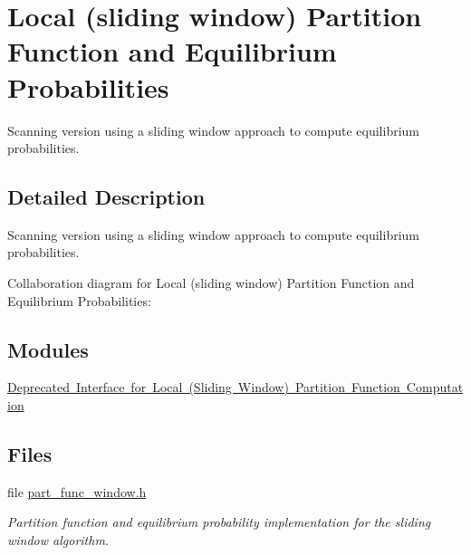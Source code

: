 \hypertarget{group__part__func__window}{}\section{Local (sliding window) Partition Function and Equilibrium Probabilities}
\label{group__part__func__window}


Scanning version using a sliding window approach to compute equilibrium probabilities.  




\subsection{Detailed Description}
Scanning version using a sliding window approach to compute equilibrium probabilities. 

Collaboration diagram for Local (sliding window) Partition Function and Equilibrium Probabilities\+:
\subsection*{Modules}
\begin{DoxyCompactItemize}
\item 
\mbox{\hyperlink{group__part__func__window__deprecated}{Deprecated Interface for Local (\+Sliding Window) Partition Function Computation}}
\end{DoxyCompactItemize}
\subsection*{Files}
\begin{DoxyCompactItemize}
\item 
file \mbox{\hyperlink{part__func__window_8h}{part\+\_\+func\+\_\+window.\+h}}
\begin{DoxyCompactList}\small\item\em Partition function and equilibrium probability implementation for the sliding window algorithm. \end{DoxyCompactList}\end{DoxyCompactItemize}
